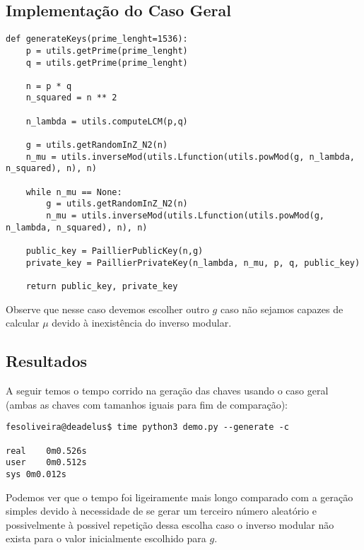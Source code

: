\documentclass[10pt]{article}
\begin{document}
        \subsection*{Implementação do Caso Geral}
            \begin{verbatim}
def generateKeys(prime_lenght=1536):
    p = utils.getPrime(prime_lenght)
    q = utils.getPrime(prime_lenght)

    n = p * q
    n_squared = n ** 2
    
    n_lambda = utils.computeLCM(p,q)

    g = utils.getRandomInZ_N2(n)
    n_mu = utils.inverseMod(utils.Lfunction(utils.powMod(g, n_lambda, n_squared), n), n)

    while n_mu == None:
        g = utils.getRandomInZ_N2(n)
        n_mu = utils.inverseMod(utils.Lfunction(utils.powMod(g, n_lambda, n_squared), n), n)

    public_key = PaillierPublicKey(n,g)
    private_key = PaillierPrivateKey(n_lambda, n_mu, p, q, public_key)

    return public_key, private_key                  
            \end{verbatim}

            Observe que nesse caso devemos escolher outro $g$ caso não sejamos capazes de calcular $\mu$ devido à inexistência do inverso modular.

        \subsection*{Resultados}
            A seguir temos o tempo corrido na geração das chaves usando o caso geral (ambas as chaves com tamanhos iguais para fim de comparação):

            \begin{verbatim}
fesoliveira@deadelus$ time python3 demo.py --generate -c

real    0m0.526s
user    0m0.512s
sys 0m0.012s                
            \end{verbatim}

            Podemos ver que o tempo foi ligeiramente mais longo comparado com a geração simples devido à necessidade de se gerar um terceiro número aleatório e possivelmente à possivel repetição dessa escolha caso o inverso modular não exista para o valor inicialmente escolhido para $g$.
\end{document}
